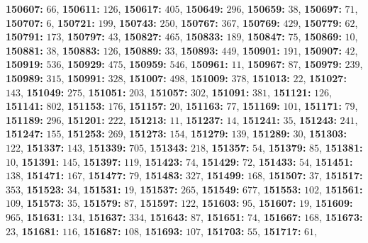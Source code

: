 \textsf{\bfseries 150607:} $66$, \textsf{\bfseries 150611:} $126$, \textsf{\bfseries 150617:} $405$, \textsf{\bfseries 150649:} $296$, \textsf{\bfseries 150659:} $38$, \textsf{\bfseries 150697:} $71$, \textsf{\bfseries 150707:} $6$, \textsf{\bfseries 150721:} $199$, \textsf{\bfseries 150743:} $250$, \textsf{\bfseries 150767:} $367$, \textsf{\bfseries 150769:} $429$, \textsf{\bfseries 150779:} $62$, \textsf{\bfseries 150791:} $173$, \textsf{\bfseries 150797:} $43$, \textsf{\bfseries 150827:} $465$, \textsf{\bfseries 150833:} $189$, \textsf{\bfseries 150847:} $75$, \textsf{\bfseries 150869:} $10$, \textsf{\bfseries 150881:} $38$, \textsf{\bfseries 150883:} $126$, \textsf{\bfseries 150889:} $33$, \textsf{\bfseries 150893:} $449$, \textsf{\bfseries 150901:} $191$, \textsf{\bfseries 150907:} $42$, \textsf{\bfseries 150919:} $536$, \textsf{\bfseries 150929:} $475$, \textsf{\bfseries 150959:} $546$, \textsf{\bfseries 150961:} $11$, \textsf{\bfseries 150967:} $87$, \textsf{\bfseries 150979:} $239$, \textsf{\bfseries 150989:} $315$, \textsf{\bfseries 150991:} $328$, \textsf{\bfseries 151007:} $498$, \textsf{\bfseries 151009:} $378$, \textsf{\bfseries 151013:} $22$, \textsf{\bfseries 151027:} $143$, \textsf{\bfseries 151049:} $275$, \textsf{\bfseries 151051:} $203$, \textsf{\bfseries 151057:} $302$, \textsf{\bfseries 151091:} $381$, \textsf{\bfseries 151121:} $126$, \textsf{\bfseries 151141:} $802$, \textsf{\bfseries 151153:} $176$, \textsf{\bfseries 151157:} $20$, \textsf{\bfseries 151163:} $77$, \textsf{\bfseries 151169:} $101$, \textsf{\bfseries 151171:} $79$, \textsf{\bfseries 151189:} $296$, \textsf{\bfseries 151201:} $222$, \textsf{\bfseries 151213:} $11$, \textsf{\bfseries 151237:} $14$, \textsf{\bfseries 151241:} $35$, \textsf{\bfseries 151243:} $241$, \textsf{\bfseries 151247:} $155$, \textsf{\bfseries 151253:} $269$, \textsf{\bfseries 151273:} $154$, \textsf{\bfseries 151279:} $139$, \textsf{\bfseries 151289:} $30$, \textsf{\bfseries 151303:} $122$, \textsf{\bfseries 151337:} $143$, \textsf{\bfseries 151339:} $705$, \textsf{\bfseries 151343:} $218$, \textsf{\bfseries 151357:} $54$, \textsf{\bfseries 151379:} $85$, \textsf{\bfseries 151381:} $10$, \textsf{\bfseries 151391:} $145$, \textsf{\bfseries 151397:} $119$, \textsf{\bfseries 151423:} $74$, \textsf{\bfseries 151429:} $72$, \textsf{\bfseries 151433:} $54$, \textsf{\bfseries 151451:} $138$, \textsf{\bfseries 151471:} $167$, \textsf{\bfseries 151477:} $79$, \textsf{\bfseries 151483:} $327$, \textsf{\bfseries 151499:} $168$, \textsf{\bfseries 151507:} $37$, \textsf{\bfseries 151517:} $353$, \textsf{\bfseries 151523:} $34$, \textsf{\bfseries 151531:} $19$, \textsf{\bfseries 151537:} $265$, \textsf{\bfseries 151549:} $677$, \textsf{\bfseries 151553:} $102$, \textsf{\bfseries 151561:} $109$, \textsf{\bfseries 151573:} $35$, \textsf{\bfseries 151579:} $87$, \textsf{\bfseries 151597:} $122$, \textsf{\bfseries 151603:} $95$, \textsf{\bfseries 151607:} $19$, \textsf{\bfseries 151609:} $965$, \textsf{\bfseries 151631:} $134$, \textsf{\bfseries 151637:} $334$, \textsf{\bfseries 151643:} $87$, \textsf{\bfseries 151651:} $74$, \textsf{\bfseries 151667:} $168$, \textsf{\bfseries 151673:} $23$, \textsf{\bfseries 151681:} $116$, \textsf{\bfseries 151687:} $108$, \textsf{\bfseries 151693:} $107$, \textsf{\bfseries 151703:} $55$, \textsf{\bfseries 151717:} $61$, 

